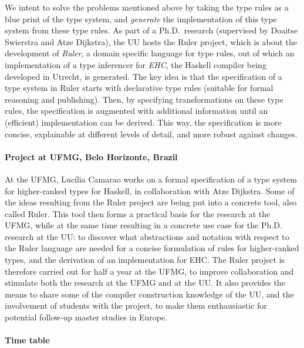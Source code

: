 \documentclass[a4paper]{article}
\begin{document}
We intent to solve the problems mentioned above by taking the type rules as a blue print of the type system, and {\it generate} the implementation of this type system from these type rules. As part of a Ph.D.~research (supervised by Doaitse Swierstra and Atze Dijkstra), the UU hosts the Ruler project, which is about the development of {\it Ruler}, a domain specific language for type rules, out of which an implementation of a type inferencer for {\it EHC}, the Haskell compiler being developed in Utrecht, is generated. The key idea is that the specification of a type system in Ruler starts with declarative type rules (suitable for formal reasoning and publishing). Then, by specifying transformations on these type rules, the specification is augmented with additional information until an (efficient) implementation can be derived. This way, the specification is more concise, explainable at different levels of detail, and more robust against changes.

\paragraph{Project at UFMG, Belo Horizonte, Brazil} At the UFMG, Luc\'{i}lia Camarao works on a formal specification of a type system for higher-ranked types for Haskell, in collaboration with Atze Dijkstra. Some of the ideas resulting from the Ruler project are being put into a concrete tool, also called Ruler. This tool then forms a practical basis for the research at the UFMG, while at the same time resulting in a concrete use case for the Ph.D. research at the UU: to discover what abstractions and notation with respect to the Ruler language are needed for a concise formulation of rules for higher-ranked types, and the derivation of an implementation for EHC. The Ruler project is therefore carried out for half a year at the UFMG, to improve collaboration and stimulate both the research at the UFMG and at the UU. It also provides the means to share some of the compiler construction knowledge of the UU, and the involvement of students with the project, to make them enthausiastic for potential follow-up master studies in Europe.

\paragraph{Time table}
\end{document}
